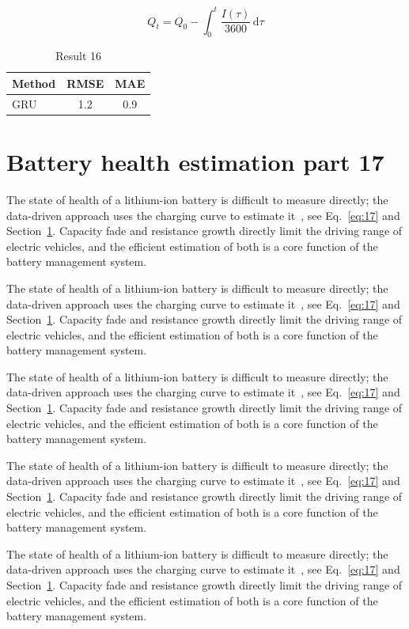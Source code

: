 \documentclass[11pt]{article}
\begin{document}
\begin{equation}\label{eq:16}
  Q_t = Q_0 - \int_0^t \frac{I(\tau)}{3600}\,\mathrm{d}\tau
\end{equation}
\begin{table}[h]\centering\begin{tabular}{lcc}\toprule Method & RMSE & MAE\\\midrule GRU & 1.2 & 0.9\\\bottomrule\end{tabular}\caption{Result 16}\end{table}

\section{Battery health estimation part 17}\label{sec:17}
The state of health of a lithium-ion battery is difficult to measure directly; the data-driven approach uses the charging curve to estimate it~\cite{a2020}, see Eq.~\eqref{eq:17} and Section~\ref{sec:17}. Capacity fade and resistance growth directly limit the driving range of electric vehicles, and the efficient estimation of both is a core function of the battery management system.

The state of health of a lithium-ion battery is difficult to measure directly; the data-driven approach uses the charging curve to estimate it~\cite{a2020}, see Eq.~\eqref{eq:17} and Section~\ref{sec:17}. Capacity fade and resistance growth directly limit the driving range of electric vehicles, and the efficient estimation of both is a core function of the battery management system.

The state of health of a lithium-ion battery is difficult to measure directly; the data-driven approach uses the charging curve to estimate it~\cite{a2020}, see Eq.~\eqref{eq:17} and Section~\ref{sec:17}. Capacity fade and resistance growth directly limit the driving range of electric vehicles, and the efficient estimation of both is a core function of the battery management system.

The state of health of a lithium-ion battery is difficult to measure directly; the data-driven approach uses the charging curve to estimate it~\cite{a2020}, see Eq.~\eqref{eq:17} and Section~\ref{sec:17}. Capacity fade and resistance growth directly limit the driving range of electric vehicles, and the efficient estimation of both is a core function of the battery management system.

The state of health of a lithium-ion battery is difficult to measure directly; the data-driven approach uses the charging curve to estimate it~\cite{a2020}, see Eq.~\eqref{eq:17} and Section~\ref{sec:17}. Capacity fade and resistance growth directly limit the driving range of electric vehicles, and the efficient estimation of both is a core function of the battery management system.
\end{document}
